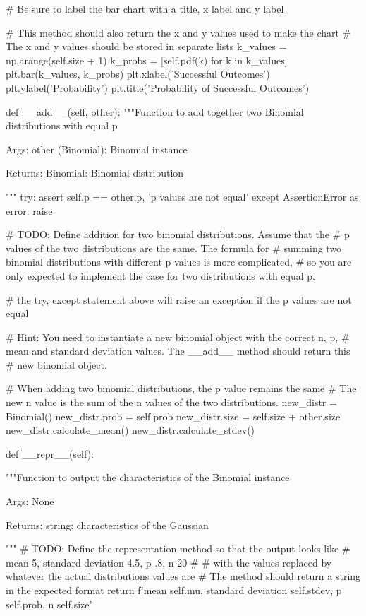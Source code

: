 \begin{python}
			#   Be sure to label the bar chart with a title, x label and y label
			
			#   This method should also return the x and y values used to make the 	chart
			#   The x and y values should be stored in separate lists
			k_values = np.arange(self.size + 1)
			k_probs = [self.pdf(k) for k in k_values]
			plt.bar(k_values, k_probs)
			plt.xlabel('Successful Outcomes')
			plt.ylabel('Probability')
			plt.title('Probability  of Successful Outcomes')
		
		def __add__(self, other):
			"""Function to add together two Binomial distributions with equal p
			
			Args:
			other (Binomial): Binomial instance
			
			Returns:
			Binomial: Binomial distribution
			
			"""
			try:
			assert self.p == other.p, 'p values are not equal'
			except AssertionError as error:
			raise
			
			# TODO: Define addition for two binomial distributions. Assume that the
			# p values of the two distributions are the same. The formula for 
			# summing two binomial distributions with different p values is more 	complicated,
			# so you are only expected to implement the case for two distributions with equal p.
			
			# the try, except statement above will raise an exception if the p 	values are not equal
			
			# Hint: You need to instantiate a new binomial object with the correct 	n, p, 
			#   mean and standard deviation values. The __add__ method should 	return this
			#   new binomial object.
			
			#   When adding two binomial distributions, the p value remains the same
			#   The new n value is the sum of the n values of the two distributions.
			new_distr = Binomial()
			new_distr.prob = self.prob
			new_distr.size = self.size + other.size
			new_distr.calculate_mean()
			new_distr.calculate_stdev()
		
		def __repr__(self):
		
			"""Function to output the characteristics of the Binomial instance
			
			Args:
			None
			
			Returns:
			string: characteristics of the Gaussian
			
			"""
			# TODO: Define the representation method so that the output looks like
			#       mean 5, standard deviation 4.5, p .8, n 20
			#
			#       with the values replaced by whatever the actual distributions 	values are
			#       The method should return a string in the expected format
			return f'mean {self.mu}, standard deviation {self.stdev}, p 	{self.prob}, n {self.size}'
\end{python}


